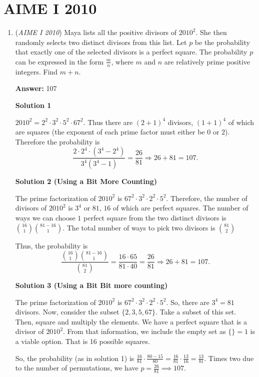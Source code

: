 \section{AIME I 2010}
        \begin{enumerate}
        	\item (\textit{AIME I 2010}) Maya lists all the positive divisors of $2010^2$. She then randomly selects two distinct divisors from this list. Let $p$ be the probability that exactly one of the selected divisors is a perfect square. The probability $p$ can be expressed in the form $\frac {m}{n}$, where $m$ and $n$ are relatively prime positive integers. Find $m + n$.


 
 \textbf{Answer: }107



\textbf{Solution 1}

$2010^2 = 2^2\cdot3^2\cdot5^2\cdot67^2$. Thus there are $(2+1)^4$ divisors, $(1+1)^4$ of which are squares (the exponent of each prime factor must either be $0$ or $2$). Therefore the probability is
 \[\frac {2\cdot2^4\cdot(3^4 - 2^4)}{3^4(3^4 - 1)} = \frac {26}{81} \Longrightarrow 26+ 81 = \boxed{107}.\]




\textbf{Solution 2 (Using a Bit More Counting)}

The prime factorization of $2010^2$ is $67^2\cdot3^2\cdot2^2\cdot5^2$. Therefore, the number of divisors of $2010^2$ is $3^4$ or $81$, $16$ of which are perfect squares. The number of ways we can choose $1$ perfect square from the two distinct divisors is $\binom{16}{1}\binom{81-16}{1}$. The total number of ways to pick two divisors is $\binom{81}{2}$

 Thus, the probability is 
 \[\frac {\binom{16}{1}\binom{81-16}{1}}{\binom{81}{2}} = \frac {16\cdot65}{81\cdot40} = \frac {26}{81} \Longrightarrow 26+ 81 = \boxed{107}.\]




\textbf{Solution 3 (Using a Bit Bit more counting)}

The prime factorization of $2010^2$ is $67^2\cdot3^2\cdot2^2\cdot5^2$. So, there are $3^4 = 81$ divisors. Now, consider the subset $\{2,3,5,67 \}$. Take a subset of this set. Then, square and multiply the elements. We have a perfect square that is a divisor of $2010^2$. From that information, we include the empty set as $\{ \} = 1$ is a viable option. That is 16 possible squares.

 So, the probability (as in solution 1) is $\frac{16}{81} \cdot \frac{80-15}{80} = \frac{16}{81} \cdot \frac{13}{16} = \frac{13}{81}$. Times two due to the number of permutations, we have $p = \frac{26}{81} \implies \boxed{107}$.


\end{enumerate}
